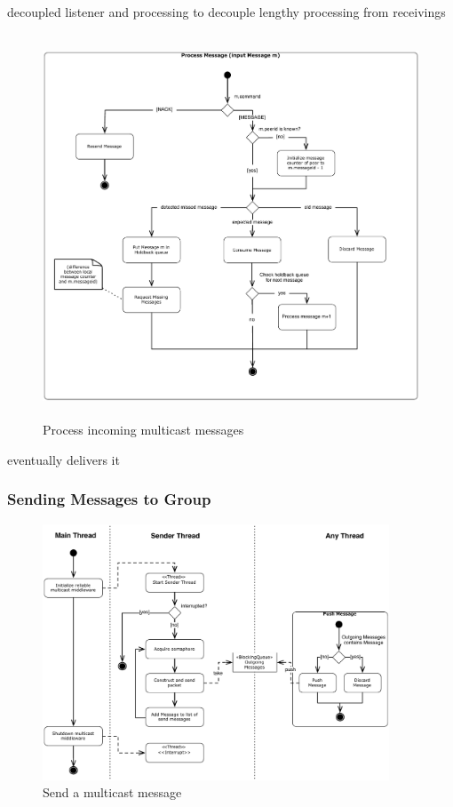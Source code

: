 decoupled listener and processing to decouple lengthy processing from receivings

\begin{figure}[htbp]
    \centering
        \includegraphics[height=4.5in]{figures/processMessages.pdf}
    \caption{Process incoming multicast messages}
    \label{fig:figures_processMessages}
\end{figure}

eventually delivers it


\subsubsection{Sending Messages to Group}

\begin{figure}[htbp]
    \centering
        \includegraphics[height=3in]{figures/sendMessage.pdf}
    \caption{Send a multicast message}
    \label{fig:figures_processMessages}
\end{figure}

